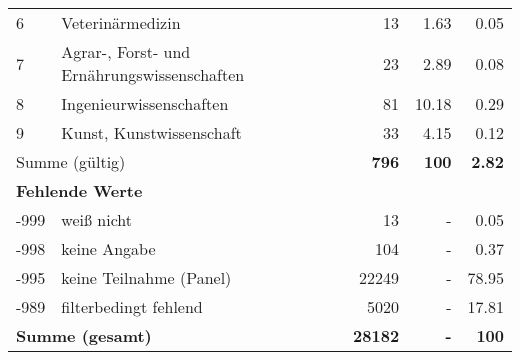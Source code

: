 \begin{longtable}{lXrrr}
     6 &
     \multicolumn{1}{X}{ Veterinärmedizin   } &


       \num{13} &
       \num[round-mode=places,round-precision=2]{1.63} &
         \num[round-mode=places,round-precision=2]{0.05} \\

     7 &
     \multicolumn{1}{X}{ Agrar-, Forst- und Ernährungswissenschaften   } &


       \num{23} &
       \num[round-mode=places,round-precision=2]{2.89} &
         \num[round-mode=places,round-precision=2]{0.08} \\

     8 &
     \multicolumn{1}{X}{ Ingenieurwissenschaften   } &


       \num{81} &
       \num[round-mode=places,round-precision=2]{10.18} &
         \num[round-mode=places,round-precision=2]{0.29} \\

     9 &
     \multicolumn{1}{X}{ Kunst, Kunstwissenschaft   } &


       \num{33} &
       \num[round-mode=places,round-precision=2]{4.15} &
         \num[round-mode=places,round-precision=2]{0.12} \\
     \midrule
     \multicolumn{2}{l}{Summe (gültig)} &
       \textbf{\num{796}} &
     \textbf{\num{100}} &
       \textbf{\num[round-mode=places,round-precision=2]{2.82}} \\
     \multicolumn{5}{l}{\textbf{Fehlende Werte}}\\
       -999 &
       weiß nicht &
         \num{13} &
        - &
         \num[round-mode=places,round-precision=2]{0.05} \\
       -998 &
       keine Angabe &
         \num{104} &
        - &
         \num[round-mode=places,round-precision=2]{0.37} \\
       -995 &
       keine Teilnahme (Panel) &
         \num{22249} &
        - &
         \num[round-mode=places,round-precision=2]{78.95} \\
       -989 &
       filterbedingt fehlend &
         \num{5020} &
        - &
         \num[round-mode=places,round-precision=2]{17.81} \\
     \midrule
     \multicolumn{2}{l}{\textbf{Summe (gesamt)}} &
          \textbf{\num{28182}} &
        \textbf{-} &
        \textbf{\num{100}} \\
     \bottomrule
     \end{longtable}
     
